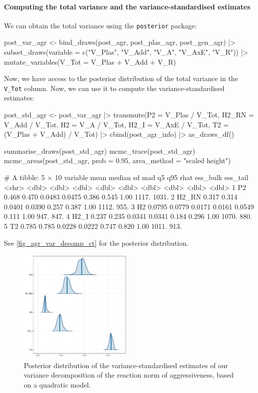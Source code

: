 \documentclass[a4paper,12pt,twoside]{article}
\begin{document}
\paragraph{Computing the total variance and the variance-standardised estimates}
We can obtain the total variance using the \texttt{posterior} package:
\begin{Rinput}
post_var_agr <-
    bind_draws(post_agr, post_plas_agr, post_gen_agr) |>
    subset_draws(variable = c("V_Plas", "V_Add", "V_A", "V_AxE", "V_R")) |>
    mutate_variables(V_Tot = V_Plas + V_Add + V_R)
\end{Rinput}
Now, we have access to the posterior distribution of the total variance in the \texttt{V\_Tot} column. Now, we can use it to compute the variance-standardised estimates:
\begin{Rinput}
post_std_agr <-
    post_var_agr |>
    transmute(P2    = V_Plas / V_Tot,
              H2_RN = V_Add / V_Tot,
              H2    = V_A / V_Tot,
              H2_I  = V_AxE / V_Tot,
              T2    = (V_Plas + V_Add) / V_Tot) |>
    cbind(post_agr_info) |>
    as_draws_df()

summarise_draws(post_std_agr)
mcmc_trace(post_std_agr)
mcmc_areas(post_std_agr,
           prob = 0.95,
           area_method = "scaled height")
\end{Rinput}
\begin{Routput}
# A tibble: 5 × 10
  variable   mean median     sd    mad     q5   q95  rhat ess_bulk ess_tail
  <chr>     <dbl>  <dbl>  <dbl>  <dbl>  <dbl> <dbl> <dbl>    <dbl>    <dbl>
1 P2       0.468  0.470  0.0483 0.0475 0.386  0.545  1.00    1117.    1031.
2 H2_RN    0.317  0.314  0.0401 0.0390 0.257  0.387  1.00    1112.     955.
3 H2       0.0795 0.0779 0.0171 0.0161 0.0549 0.111  1.00     947.     847.
4 H2_I     0.237  0.235  0.0341 0.0341 0.184  0.296  1.00    1070.     880.
5 T2       0.785  0.785  0.0228 0.0222 0.747  0.820  1.00    1011.     913.
\end{Routput}
See \autoref{fig_agr_var_decomp_ct} for the posterior distribution.

\begin{figure}[h!t!]
  \includegraphics[width = 0.49\textwidth]{Aggressiveness_varstd_ct.pdf}
  \caption{Posterior distribution of the variance-standardised estimates of our variance decomposition of the reaction norm of aggressiveness, based on a quadratic model.}
  \label{fig_agr_var_decomp_ct}
\end{figure}
\end{document}
